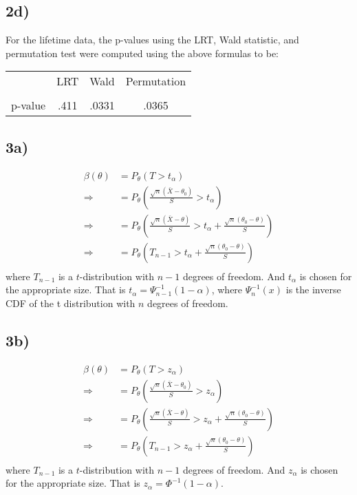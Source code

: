 \documentclass[11pt]{article}
\def\hline{ \textcolor{lgrey}{\hrulefill} }
\begin{document}
\subsection*{2d)}
For the lifetime data, the p-values using the LRT, Wald statistic, and
permutation test were computed using the above formulas to be:

\begin{center}
\begin{tabular}{c|ccc}
  & LRT & Wald & Permutation \\
  \hline & \hline & \hline & \hline \\
  p-value  & .411 & .0331 &.0365
\end{tabular}
\end{center}

\subsection*{3a)}
\[
\begin{aligned}
  \beta(\theta) &= P_\theta(T>t_\alpha) \\
  \Rightarrow &= P_\theta(\frac{\sqrt{n} (\bar X - \theta_0) }{S} > t_\alpha) \\
  \Rightarrow &= P_\theta(\frac{\sqrt{n} (\bar X - \theta) }{S} > t_\alpha + \frac{\sqrt{n} (\theta_0-\theta)}{S}) \\
  \Rightarrow &= P_\theta(T_{n-1} > t_\alpha + \frac{\sqrt{n} (\theta_0-\theta)}{S}) \\
\end{aligned}
\]
where $T_{n-1}$ is a $t$-distribution with $n-1$ degrees of freedom. And
$t_\alpha$ is chosen for the appropriate size.  That is $t_\alpha =
\Psi_{n-1}^{-1}(1-\alpha)$, where $\Psi_{n}^{-1}(x)$ is the inverse CDF of the
t distribution with $n$ degrees of freedom.


\subsection*{3b)}
\[
\begin{aligned}
  \beta(\theta) &= P_\theta(T>z_\alpha) \\
  \Rightarrow &= P_\theta(\frac{\sqrt{n} (\bar X - \theta_0) }{S} > z_\alpha) \\
  \Rightarrow &= P_\theta(\frac{\sqrt{n} (\bar X - \theta) }{S} > z_\alpha + \frac{\sqrt{n} (\theta_0-\theta)}{S}) \\
  \Rightarrow &= P_\theta(T_{n-1} > z_\alpha + \frac{\sqrt{n} (\theta_0-\theta)}{S}) \\
\end{aligned}
\]
where $T_{n-1}$ is a $t$-distribution with $n-1$ degrees of freedom. And $z_\alpha$ is chosen for the appropriate size.
That is $z_\alpha = \Phi^{-1}(1-\alpha)$.
\end{document}
